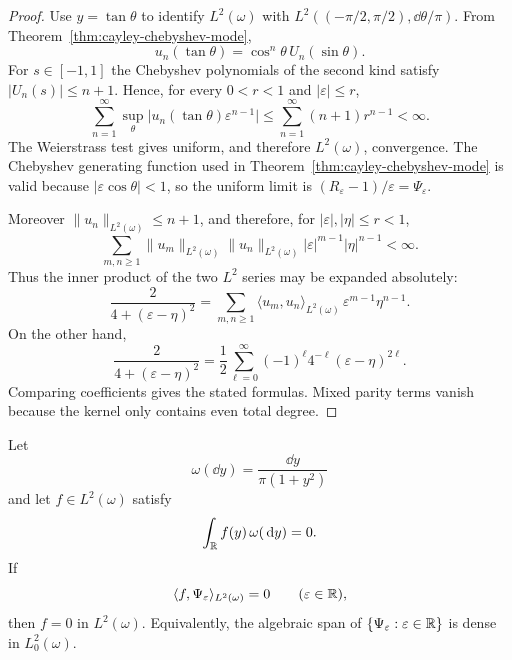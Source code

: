 \begin{proof}
Use $y=\tan\theta$ to identify $L^2(\omega)$ with
$L^2((-\pi/2,\pi/2),\dd\theta/\pi)$.  From
Theorem~\ref{thm:cayley-chebyshev-mode},
\[
u_n(\tan\theta)=\cos^n\theta\,U_n(\sin\theta).
\]
For $s\in[-1,1]$ the Chebyshev polynomials of the second kind satisfy
$|U_n(s)|\le n+1$.  Hence, for every $0<r<1$ and
$|\varepsilon|\le r$,
\[
\sum_{n=1}^{\infty}
\sup_{\theta}\bigl|u_n(\tan\theta)\varepsilon^{n-1}\bigr|
\le
\sum_{n=1}^{\infty}(n+1)r^{n-1}<\infty.
\]
The Weierstrass test gives uniform, and therefore $L^2(\omega)$,
convergence.  The Chebyshev generating function used in
Theorem~\ref{thm:cayley-chebyshev-mode} is valid because
$|\varepsilon\cos\theta|<1$, so the uniform limit is
$(R_\varepsilon-1)/\varepsilon=\Psi_\varepsilon$.

Moreover $\|u_n\|_{L^2(\omega)}\le n+1$, and therefore, for
$|\varepsilon|,|\eta|\le r<1$,
\[
\sum_{m,n\ge1}
\|u_m\|_{L^2(\omega)}\|u_n\|_{L^2(\omega)}
|\varepsilon|^{m-1}|\eta|^{n-1}<\infty.
\]
Thus the inner product of the two $L^2$ series may be expanded
absolutely:
\[
\frac{2}{4+(\varepsilon-\eta)^2}
=\sum_{m,n\ge 1}
\langle u_m,u_n\rangle_{L^2(\omega)}\,
\varepsilon^{m-1}\eta^{n-1}.
\]
On the other hand,
\[
\frac{2}{4+(\varepsilon-\eta)^2}
=\frac12\sum_{\ell=0}^{\infty}
(-1)^\ell 4^{-\ell}(\varepsilon-\eta)^{2\ell}.
\]
Comparing coefficients gives the stated formulas.  Mixed parity terms
vanish because the kernel only contains even total degree.
\end{proof}

\begin{lemma}%
\label{lem:poisson-injectivity-weighted}
Let
\[
\omega(\dd y)=\frac{\dd y}{\pi(1+y^2)}
\]
and let \(f\in L^2(\omega)\) satisfy
\[
\int_{\mathbb{R}}f(y)\,\omega(\,\mathrm{d} y)=0 .
\]
If
\[
\langle f,\Psi_\varepsilon\rangle_{L^2(\omega)}=0
\qquad(\varepsilon\in\mathbb{R}),
\]
then \(f=0\) in \(L^2(\omega)\).  Equivalently, the algebraic span of
\(\{\Psi_\varepsilon:\varepsilon\in\mathbb{R}\}\) is dense in \(L^2_0(\omega)\).
\end{lemma}

